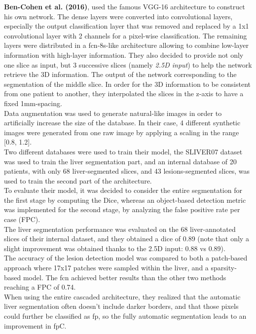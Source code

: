 \textbf{Ben-Cohen et al. (2016)}, used the famous VGG-16 architecture to
construct his own network. The dense layers were converted into
convolutional layers, especially the output classification layer that
was removed and replaced by a 1x1 convolutional layer with 2 channels
for a pixel-wise classification. The remaining layers were distributed
in a \ac{fcn}-8s-like architecture allowing to combine low-layer information
with high-layer information. They also decided to provide not only one
slice as input, but 3 successive slices (namely \emph{2.5D input}) to
help the network retrieve the 3D information. The output of the network
corresponding to the segmentation of the middle slice. In order for the
3D information to be consistent from one patient to another, they
interpolated the slices in the z-axis to have a fixed 1mm-spacing.\\
Data augmentation was used to generate natural-like images in order to
artificially increase the size of the database. In their case, 4
different synthetic images were generated from one raw image by applying
a scaling in the range {[}0.8, 1.2{]}.\\
Two different databases were used to train their model, the SLIVER07
dataset was used to train the liver segmentation part, and an internal
database of 20 patients, with only 68 liver-segmented slices, and 43
lesions-segmented slices, was used to train the second part of the
architecture.\\
To evaluate their model, it was decided to consider the entire
segmentation for the first stage by computing the Dice, whereas an
object-based detection metric was implemented for the second stage, by
analyzing the false positive rate per case (FPC). \\
The liver segmentation performance was evaluated on the 68
liver-annotated slices of their internal dataset, and they obtained a
dice of 0.89 (note that only a slight improvement was obtained thanks to
the 2.5D input: 0.88 vs 0.89).\\
The accuracy of the lesion detection model was compared to both a
patch-based approach where 17x17 patches were sampled within the liver,
and a sparsity-based model. The \ac{fcn} achieved better results than the
other two methods reaching a FPC of 0.74.\\
When using the entire cascaded architecture, they realized that the
automatic liver segmentation often doesn't include darker borders, and
that those pixels could further be classified as \ac{fp}, so the fully
automatic segmentation leads to an improvement in \ac{fp}C.


